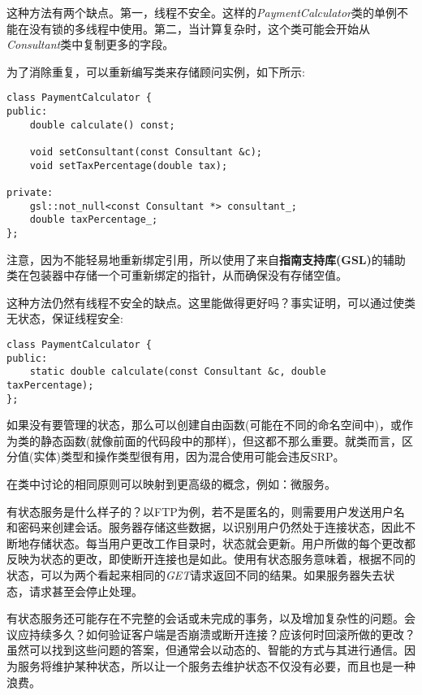 这种方法有两个缺点。第一，线程不安全。这样的\textit{PaymentCalculator}类的单例不能在没有锁的多线程中使用。第二，当计算复杂时，这个类可能会开始从\textit{Consultant}类中复制更多的字段。

为了消除重复，可以重新编写类来存储顾问实例，如下所示:

\begin{lstlisting}[style=styleCXX]
class PaymentCalculator {
public:
	double calculate() const;
	
	void setConsultant(const Consultant &c);
	void setTaxPercentage(double tax);
	
private:
	gsl::not_null<const Consultant *> consultant_;
	double taxPercentage_;
};
\end{lstlisting}

注意，因为不能轻易地重新绑定引用，所以使用了来自\textbf{指南支持库(GSL)}的辅助类在包装器中存储一个可重新绑定的指针，从而确保没有存储空值。

这种方法仍然有线程不安全的缺点。这里能做得更好吗？事实证明，可以通过使类无状态，保证线程安全:

\begin{lstlisting}[style=styleCXX]
class PaymentCalculator {
public:
	static double calculate(const Consultant &c, double taxPercentage);
};
\end{lstlisting}

如果没有要管理的状态，那么可以创建自由函数(可能在不同的命名空间中)，或作为类的静态函数(就像前面的代码段中的那样)，但这都不那么重要。就类而言，区分值(实体)类型和操作类型很有用，因为混合使用可能会违反SRP。


在类中讨论的相同原则可以映射到更高级的概念，例如：微服务。

有状态服务是什么样子的？以FTP为例，若不是匿名的，则需要用户发送用户名和密码来创建会话。服务器存储这些数据，以识别用户仍然处于连接状态，因此不断地存储状态。每当用户更改工作目录时，状态就会更新。用户所做的每个更改都反映为状态的更改，即使断开连接也是如此。使用有状态服务意味着，根据不同的状态，可以为两个看起来相同的\textit{GET}请求返回不同的结果。如果服务器失去状态，请求甚至会停止处理。

有状态服务还可能存在不完整的会话或未完成的事务，以及增加复杂性的问题。会议应持续多久？如何验证客户端是否崩溃或断开连接？应该何时回滚所做的更改？虽然可以找到这些问题的答案，但通常会以动态的、智能的方式与其进行通信。因为服务将维护某种状态，所以让一个服务去维护状态不仅没有必要，而且也是一种浪费。


